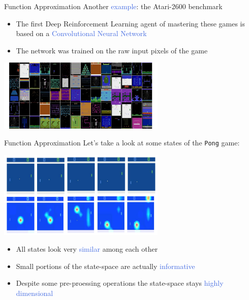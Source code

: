 \documentclass{beamer}
\begin{document}
\begin{frame}{Function Approximation}
	Another \textcolor{RoyalBlue}{example}: the Atari-2600 benchmark

	\begin{itemize}
		\item The first Deep Reinforcement Learning agent of mastering these games is based on a \textcolor{RoyalBlue}{Convolutional Neural Network}
		\item The network was trained on the raw input pixels of the game
	\end{itemize}
	
	\begin{center}
		\includegraphics[width=8cm]{./Images/games}
	\end{center}
\end{frame}


\begin{frame}{Function Approximation}
	Let's take a look at some states of the \texttt{Pong} game:
	\begin{center}
		\includegraphics[width=8cm]{./Images/pong}
	\end{center}


	\begin{itemize}
		\item All states look very \textcolor{RoyalBlue}{similar} among each other
		\item Small portions of the state-space are actually \textcolor{RoyalBlue}{informative}
		\item Despite some pre-proessing operations the state-space stays \textcolor{RoyalBlue}{highly dimensional}
	\end{itemize}

\end{frame}
\end{document}
